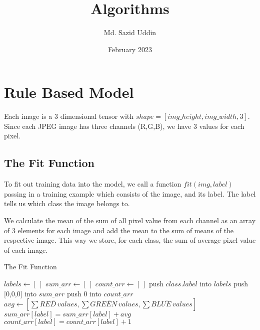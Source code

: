 \documentclass{article}
\title{Algorithms}
\author{Md. Sazid Uddin}
\date{February 2023}
\begin{document}
\maketitle

\section{Rule Based Model}
Each image is a 3 dimensional tensor with $shape=[img\_height, img\_width, 3]$. Since each JPEG image has three channels (R,G,B), we have 3 values for each pixel.\par
\subsection{The Fit Function}
To fit out training data into the model, we call a function \(fit(img, label)\) passing in a training example which consists of the image, and its label. The label tells us which class the image belongs to.\par
We calculate the mean of the sum of all pixel value from each channel as an array of 3 elements for each image and add the mean to the sum of means of the respective image. This way we store, for each class, the sum of average pixel value of each image.\par
\begin{algorithm}
\caption{The Fit Function}
\begin{algorithmic}[1]
\State $labels \gets [\ ]$
\State $sum\_arr \gets [\ ]$
\State $count\_arr \gets [\ ]$
\State push $class.label$ into $labels$
\State push [0,0,0] into $sum\_arr$
\State push 0 into $count\_arr$
\EndFor
{}
\State $avg \gets [\overline{\sum RED\ values},\overline{\sum GREEN\ values},\overline{\sum BLUE\ values}]$ 
\State $sum\_arr[label] = sum\_arr[label] + avg$
\State $count\_arr[label] = count\_arr[label] + 1$
\EndFor
\EndProcedure
\end{algorithmic}
\end{algorithm}
\end{document}
